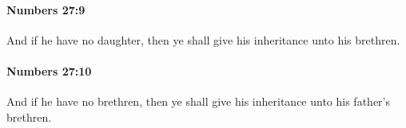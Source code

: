 		\paragraph{Numbers 27:9} %
			\label{NUMBERS-27-9}

			And if he have no daughter, then ye shall give his inheritance unto his brethren.


		\paragraph{Numbers 27:10} %
			\label{NUMBERS-27-10}

			And if he have no brethren, then ye shall give his inheritance unto his father’s brethren.


